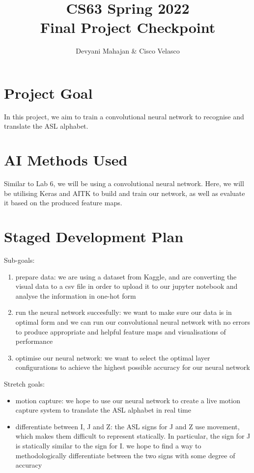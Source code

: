 \documentclass[11pt]{article}
\title{CS63 Spring 2022\\Final Project Checkpoint}
\author{Devyani Mahajan & Cisco Velasco}
\date{}
\begin{document}
\maketitle

\section{Project Goal}

In this project, we aim to train a convolutional neural network to recognise and
translate the ASL alphabet.

\section{AI Methods Used}

Similar to Lab 6, we will be using a convolutional neural network. Here, we will
be utilising Keras and AITK to build and train our network, as well as evaluate
it based on the produced feature maps.

\section{Staged Development Plan}

Sub-goals:
\begin{enumerate}
  \item prepare data: we are using a dataset from Kaggle, and are converting the visual
data to a csv file in order to upload it to our jupyter notebook and analyse the
information in one-hot form
  \item run the neural network succesfully: we want to make sure our data is in optimal
form and we can run our convolutional neural network with no errors to produce
appropriate and helpful feature maps and visualisations of performance
  \item optimise our neural network: we want to select the optimal layer configurations
to achieve the highest possible accuracy for our neural network
\end{enumerate}

Stretch goals:
\begin{itemize}
  \item motion capture: we hope to use our neural network to create a live motion capture
system to translate the ASL alphabet in real time
  \item differentiate between I, J and Z: the ASL signs for J and Z use movement, which
makes them difficult to represent statically. In particular, the sign for J is
statically similar to the sign for I. we hope to find a way to methodologically
differentiate between the two signs with some degree of accuracy
\end{itemize}
\end{document}
